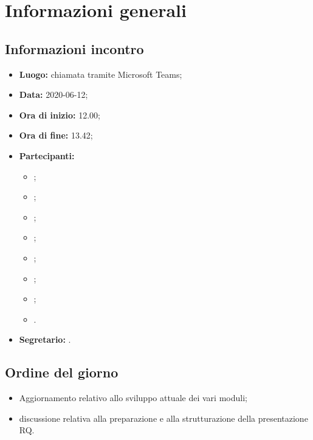 \section{Informazioni generali}
\subsection{Informazioni incontro}
\begin{itemize}
	\item \textbf{Luogo:} chiamata tramite Microsoft Teams;
	\item \textbf{Data:} 2020-06-12;
	\item \textbf{Ora di inizio:} 12.00;
	\item \textbf{Ora di fine:} 13.42;
	\item \textbf{Partecipanti:}
		\begin{itemize}
			\item \VB;
			\item \LB;
			\item \NF;
			\item \EG;
			\item \FJ;
			\item \MP;
			\item \AS;
			\item \AZ.
		\end{itemize}
	\item \textbf{Segretario:} \AS.
\end{itemize}

\subsection{Ordine del giorno}
\begin{itemize}
	\item Aggiornamento relativo allo sviluppo attuale dei vari moduli;
	\item discussione relativa alla preparazione e alla strutturazione della presentazione RQ.
\end{itemize}
